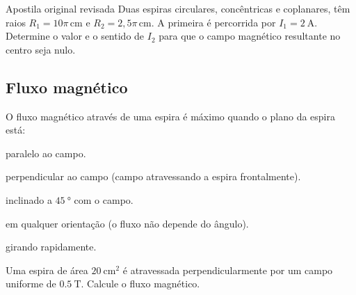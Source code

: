 \begin{questao}[3]{Apostila original revisada}
Duas espiras circulares, concêntricas e coplanares, têm raios
$R_1=10\pi\,\si{\centi\metre}$ e $R_2=2{,}5\pi\,\si{\centi\metre}$. A primeira é
percorrida por $I_1=\SI{2}{\ampere}$. Determine o valor e o sentido de $I_2$ para
que o campo magnético resultante no centro seja nulo.
\end{questao}




\subsection{Fluxo magnético}

\blocofixacao

\begin{questao}[1]{}
O fluxo magnético através de uma espira é máximo quando o plano da espira está:
\begin{alternativas}
\item paralelo ao campo.
\item perpendicular ao campo (campo atravessando a espira frontalmente).
\item inclinado a $\SI{45}{\degree}$ com o campo.
\item em qualquer orientação (o fluxo não depende do ângulo).
\item girando rapidamente.
\end{alternativas}
\end{questao}

\begin{questao}[1]{}
Uma espira de área $\SI{20}{\centi\meter\squared}$ é atravessada
perpendicularmente por um campo uniforme de $\SI{0.5}{\tesla}$. Calcule o fluxo
magnético.
\end{questao}

